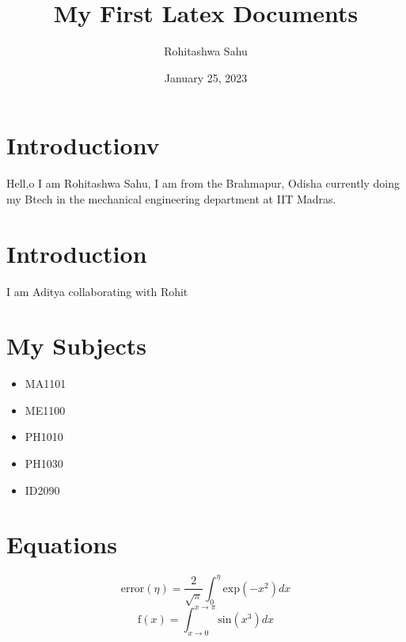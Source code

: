 \documentclass[12pt,a4paper]{article}
\author{Rohitashwa Sahu}
\title{My First Latex Documents}
\date{January 25, 2023}
\begin{document}
 \maketitle
 \section{Introductionv}
  Hell,o I am Rohitashwa Sahu, I am from the Brahmapur, Odisha currently doing my Btech in the mechanical engineering department at IIT Madras.
  \section{Introduction}
  I am Aditya collaborating with Rohit
\section{My Subjects}
\begin{itemize}
    \item MA1101
    \item ME1100
    \item PH1010
    \item PH1030
    \item ID2090
\end{itemize}

\section{Equations}
\begin{equation}
    \text{error}(\eta) = \frac{2}{\sqrt{\pi}} \int_{0}^{\eta}{ \text{exp}(-x^2) dx}
\end{equation}
\begin{equation}
    \text{f}(x)=\int_{x\rightarrow0}^{x\rightarrow\pi}{\text{sin}(x^3) dx}
\end{equation}
\end{document}
